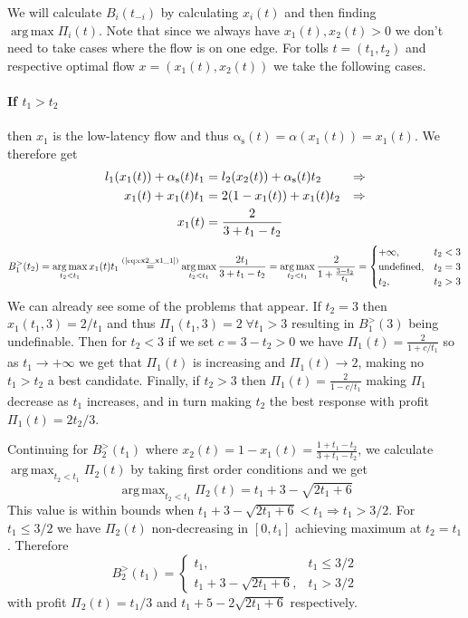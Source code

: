 \documentclass[10pt,a4paper]{book}
\newcommand{\indeq}[1]{\stackrel{\text{#1}}{=}}
\newcommand{\as}{\mathrm{\alpha_s}}
\DeclareMathOperator*{\argmax}{arg\,max}
\theoremstyle{definition}
\theoremstyle{comment}
\begin{document}
We will calculate $B_i(t_{-i})$ by calculating $x_i(t)$ and then finding $\argmax \Pi_i(t)$.
Note that since we always have $x_1(t), x_2(t) > 0$ we don't need to take cases where the flow is on one edge.
For tolls $t = (t_1, t_2)$ and respective optimal flow $x = (x_1(t), x_2(t))$ we take the following cases.

\paragraph{If $t_1 > t_2$}
then $x_1$ is the low-latency flow and thus $\as(t) = \alpha(x_1(t)) = x_1(t)$.
We therefore get
\begin{align}
	l_1(x_1(t)) + \as(t) t_1 &= l_2(x_2(t)) + \as(t) t_2 &\Rightarrow \notag \\
	x_1(t) + x_1(t) t_1 &= 2 (1 - x_1(t)) + x_1(t) t_2 &\Rightarrow \notag \\
	x_1(t) &= \frac{2}{3 + t_1 - t_2} \label{eq:ex2_x1_1}
\end{align}
\[
	B_1^>(t_2) = \argmax_{t_2 < t_1} x_1(t) t_1 \indeq{(\ref{eq:ex2_x1_1})} \argmax_{t_2 < t_1} \frac{2 t_1}{3 + t_1 - t_2} = \argmax_{t_2 < t_1} \frac{2}{1 + \frac{3 - t_2}{t_1}} =
		\begin{cases}
			+\infty, & t_2 < 3 \\
			\textrm{undefined}, & t_2 = 3 \\
			t_2, & t_2 > 3 \\
		\end{cases}
\]
We can already see some of the problems that appear.
If $t_2 = 3$ then $x_1(t_1, 3) = 2/t_1$ and thus $\Pi_1(t_1, 3) = 2 \; \forall t_1 > 3$ resulting in $B_1^>(3)$ being undefinable.
Then for $t_2 < 3$ if we set $c = 3 - t_2 > 0$ we have $\Pi_1(t) = \frac{2}{1 + c/t_1}$ so as $t_1 \rightarrow +\infty$ we get that $\Pi_1(t)$ is increasing and $\Pi_1(t) \rightarrow 2$, making no $t_1 > t_2$ a best candidate.
Finally, if $t_2 > 3$ then $\Pi_1(t) = \frac{2}{1 - c/t_1}$ making $\Pi_1$ decrease as $t_1$ increases, and in turn making $t_2$ the best response with profit $\Pi_1(t) = {2 t_2}/3$.

Continuing for $B_2^>(t_1)$ where $x_2(t) = 1 - x_1(t) = \frac{1 + t_1 - t_2}{3 + t_1 - t_2}$, we calculate $\argmax_{t_2 < t_1} \Pi_2(t)$ by taking first order conditions and we get
\[\argmax_{t_2 < t_1} \Pi_2(t) = t_1 + 3 - \sqrt{2 t_1 + 6}\]
This value is within bounds when $t_1 + 3 - \sqrt{2 t_1 + 6} < t_1 \Rightarrow t_1 > 3/2$.
For $t_1 \le 3/2$ we have $\Pi_2(t)$ non-decreasing in $[0, t_1]$ achieving maximum at $t_2 = t_1$.
Therefore
\[
	B_2^>(t_1) =
		\begin{cases}
			t_1, & t_1 \le 3/2 \\
			t_1 + 3 - \sqrt{2 t_1 + 6}, & t_1 > 3/2
		\end{cases}
\]
with profit $\Pi_2(t) = t_1/3$ and $t_1 + 5 - 2 \sqrt{2 t_1 + 6}$ respectively.
\end{document}
